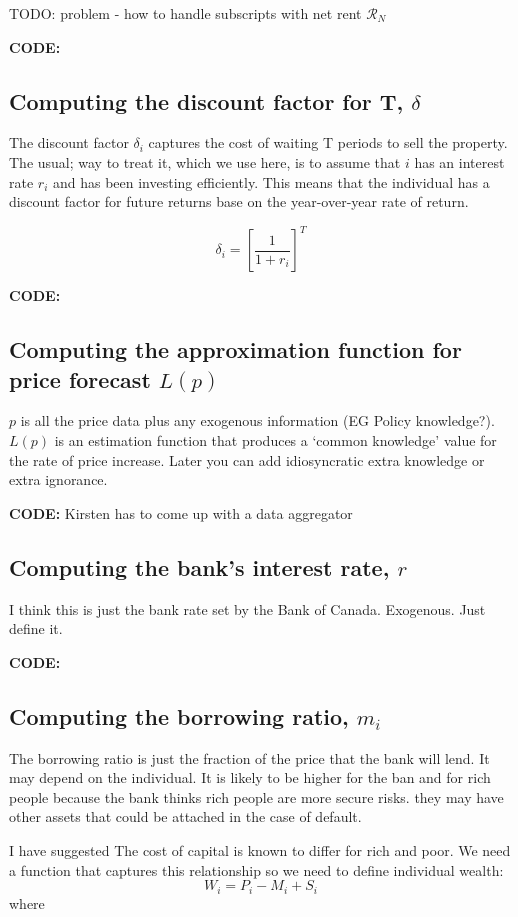 TODO: problem - how to handle subscripts with net rent $\mathcal{R}_N$

\textbf{CODE:}  

\subsection{Computing the discount factor for T, $\delta$}
The discount factor $\delta_i$ captures the cost of waiting T periods to sell the property. The usual; way to treat it, which we use here, is to assume that $i$ has an interest rate $r_i$ and has been investing efficiently. This means that  the individual has a discount factor for future returns base on the year-over-year rate of return. 

\[\delta_i=\left[\frac{1}{1+r_i}\right]^T\]

\textbf{CODE:}  
\subsection{Computing the approximation function for price forecast $L(p)$}
$p$ is all the price data plus any exogenous information (EG Policy knowledge?). $L(p)$ is an estimation function that produces a `common knowledge' value for the rate of price increase. Later you can add idiosyncratic extra knowledge or extra ignorance.

\textbf{CODE:}  Kirsten has to come up with a data aggregator 



\subsection{Computing the bank's interest rate, $r$}

I think this is just the bank rate set by the Bank of Canada. Exogenous. Just define it.

\textbf{CODE:}  

\subsection{Computing the borrowing ratio, $m_i$}
The borrowing ratio is just the fraction of the price that the bank will lend. It may depend on the individual. It is likely to be higher for the ban and for rich people because the bank thinks rich people are more secure risks. they may have other assets that could be attached in the case of default.


I have suggested The cost of capital is known to differ for rich and poor. We need a function that captures this relationship so we need to define individual wealth:
\[W_i= P_i -M_i  +S_i\]
where 

